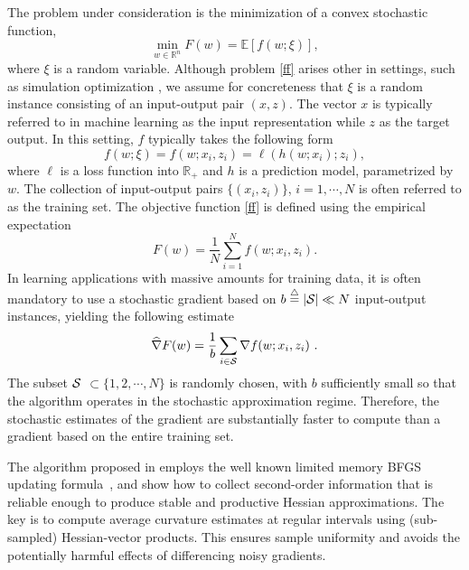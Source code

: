 \documentclass[12pt]{article}
\newcommand{\R}{\mathbb{R}}
\newcommand{\bg}{\widehat{\nabla}F}
\newcommand{\Ss}{{\cal S}}
\newcommand{\defeq}{\stackrel{\triangle}{=}}
\begin{document}
The problem under consideration is the minimization of a convex stochastic
function, 
\begin{equation}  \label{ff}  
     \min_{w \in \R^n} F(w)   =  \mathbb{E} [f(w; \xi)]  ,
\end{equation}
where $\xi$ is a random variable. Although problem \eqref{ff} arises other in
settings, such as simulation optimization \cite{asmussen2007stochastic}, we assume for concreteness that $\xi$
is a random instance consisting of an input-output pair $(x,z)$. The vector
$x$ is typically referred to in machine learning as the input representation while $z$ as the
target output. In this setting, $f$ typically takes the following form
\begin{equation}   \label{pp}
  f(w; \xi)= f(w;x_i, z_i) = \ell (h(w; x_i); z_i),
\end{equation}
where $\ell$ is a loss function into $\R_+$ and $h$ is a
prediction model, parametrized by $w$. The collection of input-output
pairs $\{(x_i, z_i)\}$, $i = 1,\cdots,N$ is often referred to as the
training set. The objective function \eqref{ff} is defined using the empirical
expectation 
\begin{equation} \label{empirical}
        F(w) = \frac{1}{N}\sum_{i=1}^N f(w;x_i, z_i).
\end{equation}
In learning applications with massive amounts for training data, it is
often mandatory to use a stochastic gradient based on $b \defeq |\Ss| \ll N$
input-output
instances, yielding the following estimate
\begin{equation}   \label{bat}
\bg(w) = \frac{1}{b} \sum_{i \in \Ss}  \nabla f(w;x_i, z_i) ~.
\end{equation}
The subset $\Ss$ $\subset \{ 1, 2, \cdots, N\}$ is randomly chosen, with 
$b $ sufficiently small so that the algorithm operates in the stochastic
approximation regime. Therefore, the stochastic estimates of the gradient are
substantially faster to compute than a gradient based on the entire  training set.

The algorithm proposed in \cite{sammy} employs the well known
limited memory BFGS updating formula~\cite{LiuNocedal89}, and
show how to collect second-order information that is reliable enough to
produce stable and productive Hessian approximations. The key is to compute
average curvature estimates at regular intervals using (sub-sampled)
Hessian-vector products. This ensures sample uniformity and
avoids the potentially harmful effects of differencing noisy gradients.  
\end{document}
